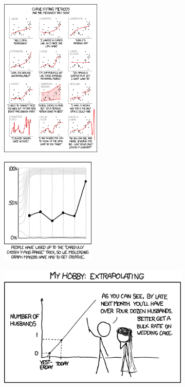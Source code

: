 \begin{figure}
\begin{subfigure}{.49\textwidth}
\centering
  \includegraphics[height=3in]{xkcd_curve_fitting.png}
\end{subfigure}
\hfill
\begin{subfigure}{.49\textwidth}
\centering
  \includegraphics[height=2in]{xkcd_y_axis_2x.png}
\end{subfigure}
\hfill
\begin{subfigure}{.49\textwidth}
\centering
  \includegraphics[width=.9\textwidth]{xkcd_extrapolating.png}
\end{subfigure}

\end{figure}
